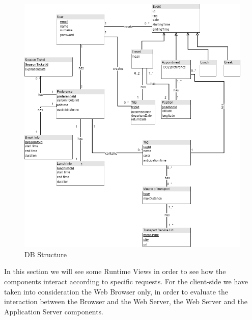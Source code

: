 \newpage
{}
\begin{figure}[H]
	\centering
	\includegraphics[scale=0.45]{Images/Architecture/DB_Structure}
	\caption{DB Structure}
\end{figure}

In this section we will see some Runtime Views in order to see how the components interact according to specific requests.
For the client-side we have taken into consideration the Web Browser only, in order to evaluate the interaction between the Browser and the Web Server, the Web Server and the Application Server components.

